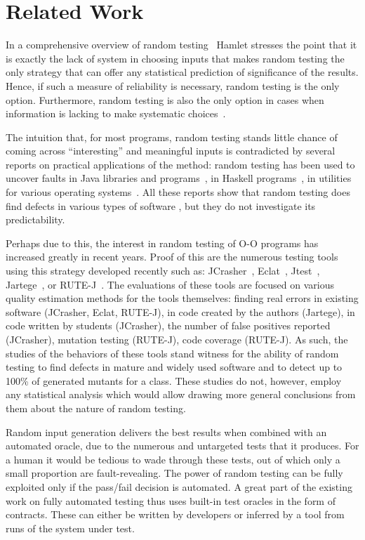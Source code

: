 \section{Related Work}\label{sec:rw}
In a comprehensive overview of random testing~\cite{Hamlet1994} Hamlet stresses the point that it is exactly
the lack of system in choosing inputs that makes random testing the
only strategy that can offer any statistical prediction of
significance of the results. Hence, if such a measure of reliability
is necessary, random testing is the only option. Furthermore, random
testing is also the only option in cases when information is lacking
to make systematic choices~\cite{Hamlet2006}.

The intuition that, for most programs, random testing stands little chance of 
coming across ``interesting'' and meaningful inputs is contradicted by several 
reports on practical applications of the method: random testing has been used 
to uncover faults in Java libraries and 
programs~\cite{Pacheco2005,Csallner2004}, in Haskell 
programs~\cite{Claessen2000}, in utilities for various operating 
systems~\cite{Forrester2000,Miller1990}. All these reports show that random 
testing does find defects in various types of software , but they do not 
investigate its predictability.

Perhaps due to this, the interest in random testing of O-O programs has increased greatly
in recent years. Proof of this are the numerous testing tools using this
strategy developed recently such as: JCrasher~\cite{Csallner2004},
Eclat~\cite{Pacheco2005}, Jtest~\cite{Jtest},
Jartege~\cite{Oriat2004}, or RUTE-J~\cite{Andrews2006a}. The
evaluations of these tools are focused on various quality estimation
methods for the tools themselves: finding real errors in existing
software (JCrasher, Eclat, RUTE-J), in code created by the authors
(Jartege), in code written by students (JCrasher), the number of
false positives reported (JCrasher), mutation testing (RUTE-J), code
coverage (RUTE-J). As such, the studies of the behaviors of these
tools stand witness for the ability of random testing to find
defects in mature and widely used software and to detect up to 100\%
of generated mutants for a class. These studies do not, however,
employ any statistical analysis which would allow drawing more
general conclusions from them about the nature of random testing.

Random input generation delivers the best results when combined with
an automated oracle, due to the numerous and untargeted tests that
it produces. For a human it would be tedious to wade through these
tests, out of which only a small proportion are fault-revealing. The
power of random testing can be fully exploited only if the pass/fail
decision is automated. A great part of the existing work on fully
automated testing
\cite{Boyapati2002,Csallner2006,Pacheco2005,Pacheco2007,Oriat2004}
thus uses built-in test oracles in the form of contracts. These can
either be written by developers or inferred by a tool
\cite{Ernst2000} from runs of the system under test. 